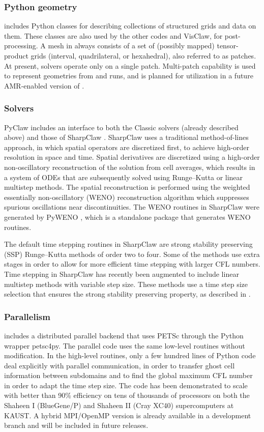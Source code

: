 \subsubsection{Python geometry}
\pyclaw includes Python classes for describing collections of structured grids
and data on them. These classes are also used by the other codes and
VisClaw, for post-processing.  A mesh in \clawpack always consists of a set of
(possibly mapped) tensor-product
grids (interval, quadrilateral, or hexahedral), also referred to as patches.
At present, \pyclaw solvers operate only on a single patch.  Multi-patch
capability is used to represent geometries from \amrclaw and \geoclaw runs, and
is planned for utilization in a future AMR-enabled version of \pyclaw.

\subsubsection{\pyclaw Solvers} 

PyClaw includes an interface to both the Classic solvers (already described above)
and those of SharpClaw \cite{ketcheson2012pyclaw}.
SharpClaw uses a traditional method-of-lines approach, in which
spatial operators are discretized first, to achieve high-order
resolution in space and time.  Spatial derivatives are discretized
using a high-order non-oscillatory reconstruction of the solution from
cell averages, which results in a system of ODEs that are subsequently
solved using Runge--Kutta or linear multistep methods. The spatial
reconstruction is performed using the weighted essentially
non-oscillatory (WENO) reconstruction algorithm which suppresses
spurious oscillations near discontinuities.  The WENO routines in
SharpClaw were generated by PyWENO \cite{pyweno}, which is a standalone package
that generates WENO routines. 

The default time stepping routines in SharpClaw are strong stability
preserving (SSP) Runge--Kutta methods of order two to four.
Some of the methods use extra stages in order to allow for more efficient
time stepping with larger CFL numbers.
Time stepping in SharpClaw has recently been augmented to include 
linear multistep methods with variable step size.  These methods use
a time step size selection that ensures the strong stability preserving
property, as described in \cite{ssp_lmm_vss}.

\subsubsection{Parallelism}
\pyclaw includes a distributed parallel backend that uses PETSc through
the Python wrapper petsc4py.  The parallel code uses the same low-level
routines without modification.  In the high-level routines, only a few
hundred lines of Python code deal explicitly with parallel communication,
in order to transfer ghost cell information between subdomains and to
find the global maximum CFL number in order to adapt the time step
size.  The code has been demonstrated to scale with better than 90\%
efficiency on tens of thousands of processors on both the Shaheen I
(BlueGene/P) and Shaheen II (Cray XC40) supercomputers at KAUST.
A hybrid MPI/OpenMP version is already available in a development branch
and will be included in future releases.

